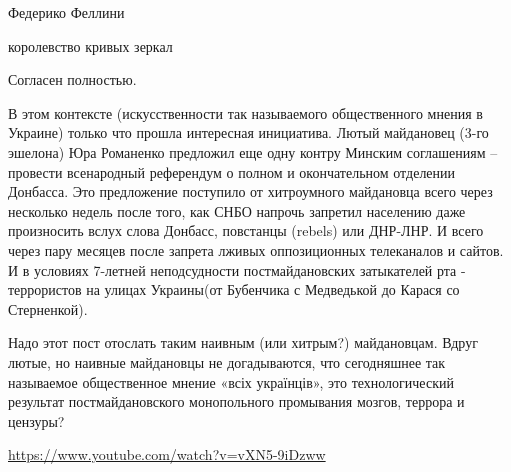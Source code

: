 \begin{itemize}
Федерико Феллини

королевство кривых зеркал


Согласен полностью.

В этом контексте (искусственности так называемого общественного мнения в
Украине) только что прошла интересная инициатива. Лютый майдановец (3-го
эшелона) Юра Романенко предложил еще одну контру Минским соглашениям – провести
всенародный референдум о полном и окончательном отделении Донбасса. Это
предложение поступило от хитроумного майдановца всего через несколько недель
после того, как СНБО напрочь запретил населению даже произносить вслух слова
Донбасс, повстанцы (rebels) или ДНР-ЛНР. И всего через пару месяцев после
запрета лживых оппозиционных телеканалов и сайтов. И в условиях 7-летней
неподсудности постмайдановских затыкателей рта - террористов на улицах
Украины(от Бубенчика с Медведькой до Карася со Стерненкой).

Надо этот пост отослать таким наивным (или хитрым?) майдановцам. Вдруг лютые,
но наивные майдановцы не догадываются, что сегодняшнее так называемое
общественное мнение «всіх українців», это технологический результат
постмайдановского монопольного промывания мозгов, террора и цензуры?

\url{https://www.youtube.com/watch?v=vXN5-9iDzww}

\end{itemize} %
